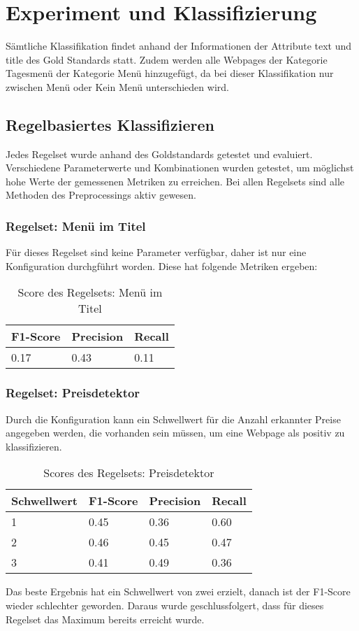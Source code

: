 \chapter{Experiment und Klassifizierung}
\label{cap:exp_class}
Sämtliche Klassifikation findet anhand der Informationen der Attribute \glqq text \grqq und \glqq title \grqq des Gold Standards statt.
Zudem werden alle Webpages der Kategorie \glqq Tagesmenü \grqq der Kategorie \glqq Menü \grqq hinzugefügt, da bei dieser Klassifikation nur zwischen \glqq Menü \grqq oder \glqq Kein Menü \grqq unterschieden wird.
\section{Regelbasiertes Klassifizieren}
Jedes Regelset wurde anhand des Goldstandards getestet und evaluiert.
Verschiedene Parameterwerte und Kombinationen wurden getestet, um möglichst hohe Werte der gemessenen Metriken zu erreichen.
Bei allen Regelsets sind alle Methoden des Preprocessings aktiv gewesen. 
\subsection{Regelset: Menü im Titel}
Für dieses Regelset sind keine Parameter verfügbar, daher ist nur eine Konfiguration durchgführt worden.
Diese hat folgende Metriken ergeben:\\
\begin{table}[H]
\caption{Score des Regelsets: Menü im Titel}
\centering
\begin{tabular}{|l|l|l|}
	\hline
	F1-Score & Precision & Recall\\
	\hline
	0.17 & 0.43 & 0.11  \\
	\hline
\end{tabular}
\end{table}
\subsection{Regelset: Preisdetektor}
Durch die Konfiguration kann ein Schwellwert für die Anzahl erkannter Preise angegeben werden, die vorhanden sein müssen, um eine Webpage als positiv zu klassifizieren.\\
\begin{table}[H]
\caption{Scores des Regelsets: Preisdetektor}
\centering
\begin{tabular}{|l|l|l|l|}
	\hline
	Schwellwert & F1-Score & Precision & Recall\\
	\hline
	1 & 0.45 & 0.36 & 0.60  \\
	2 & 0.46 & 0.45 & 0.47 \\
	3 & 0.41 & 0.49 & 0.36 \\
	\hline
\end{tabular}
\end{table}
Das beste Ergebnis hat ein Schwellwert von zwei erzielt, danach ist der F1-Score wieder schlechter geworden.
Daraus wurde geschlussfolgert, dass für dieses Regelset das Maximum bereits erreicht wurde.
